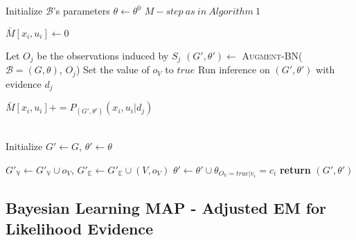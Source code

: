 \documentclass[11pt]{article}
\begin{document}
\begin{article}
\begin{algorithm*}[h!]
\begin{multicols}{2}
\begin{algorithmic}[1]
\State Initialize $\mathcal{B}$'s parameters $\theta \leftarrow \theta^0$
  \State $M-step \ as \ in \ Algorithm \ 1$
\EndFor
\EndProcedure
\\

   \State $\bar{M}[x_{i},u_{i}]\leftarrow 0$
  \EndFor
\EndFor


    \State Let $O_j$ be the observations induced by $S_j$
    \State $(G',\theta') \leftarrow$ \textsc{Augment-BN}($\mathcal{B}=(G,\theta)$, $O_{j}$)
      \State Set the value of $o_V$ to $true$
    \EndFor
    \State Run inference on $(G',\theta')$ with evidence $d_{j}$
    
        \State $\bar{M}[x_{i},u_{i}] \mathrel{{+}{=}} P_{(G',\theta')}(x_{i},u_{i}|d_{j})$
    
      \EndFor
    \EndFor
\EndFor
\EndFunction
\\
  \State Initialize $G'\leftarrow G$, $\theta'\leftarrow\theta$

    \State $G'_{\mathbb{V}}\leftarrow G'_{\mathbb{V}}\cup o_{V}$, $G'_{\mathbb{E}}\leftarrow G'_{\mathbb{E}}\cup(V,o_{V})$      
       
      \State $\theta'\leftarrow\theta'\cup\theta_{O_{V}=true|v_{i}}=c_{i}$ 
    \EndFor
  \EndFor
\State \textbf{return} $(G',\theta')$
\end{algorithmic}
\end{multicols}
\end{algorithm*}

\newpage

\subsection{Bayesian Learning MAP - Adjusted EM for Likelihood Evidence}
\label{sec:org69d2e60}


\end{article}
\end{document}
